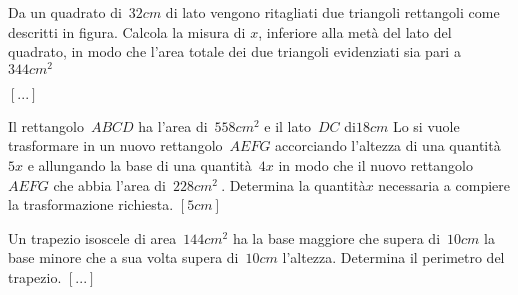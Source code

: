 \begin{multicols}{2}
\begin{esercizio}[\Ast]
 \label{ese:3.144}
Da un quadrato di~\(32\unit{cm}\) di lato vengono ritagliati due triangoli 
rettangoli
come descritti in figura. Calcola la misura di \(x\),
inferiore alla metà del lato del quadrato, in modo che l'area totale dei
due triangoli evidenziati sia pari a~\(344\unit{cm^2}\)
\begin{center}
 
\end{center}
\vspace*{-2em}
\hfill\(\left[...\right]\)
\end{esercizio}

\begin{esercizio}[\Ast]
 \label{ese:3.145}
Il rettangolo~\(ABCD\) ha l'area di~\(558\unit{cm^2}\) e il lato~\(DC\) 
di\( 
18\unit{cm}\) Lo si
vuole trasformare in un nuovo rettangolo~\(AEFG\) accorciando l'altezza di 
una 
quantità~\(5x\) e allungando la base di una quantità~\(4x\) in modo che il 
nuovo 
rettangolo~\(AEFG\) che abbia l'area di~\(228\unit{cm^2}~\).
Determina la quantità\( x\) necessaria a compiere la trasformazione 
richiesta.
\hfill\(\left[5\unit{cm}\right]\)
\end{esercizio}
% 

\begin{esercizio}
 \label{ese:3.147}
Un trapezio isoscele di area~\(144\unit{cm^2}\) ha la base maggiore che 
supera 
di~\(10\unit{cm}\)
la base minore che a sua volta supera di~\(10\unit{cm}\) l'altezza. 
Determina 
il 
perimetro del trapezio.
\hfill\(\left[...\right]\)
\end{esercizio}
% 
%  


\end{multicols}
